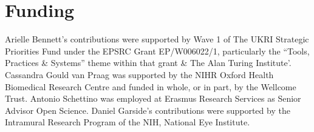 \documentclass[authordate,meta,issue]{jote-new-article}
\begin{document}
\section{Funding}



Arielle Bennett's contributions were supported by Wave 1 of The UKRI Strategic Priorities Fund under the EPSRC Grant EP/W006022/1, particularly the “Tools, Practices \& Systems” theme within that grant \& The Alan Turing Institute'. Cassandra Gould van Praag was supported by the NIHR Oxford Health Biomedical Research Centre and funded in whole, or in part, by the Wellcome Trust. Antonio Schettino was employed at Erasmus Research Services as Senior Advisor Open Science. Daniel Garside’s contributions were supported by the Intramural Research Program of the NIH, National Eye Institute.

\printbibliography
\end{document}
